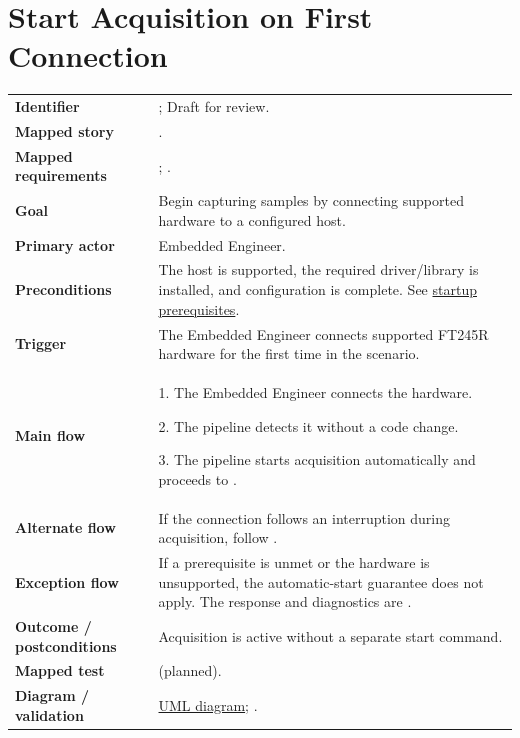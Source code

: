 \section{Start Acquisition on First Connection}
\begin{tabularx}{\linewidth}{L{3.5cm}Y}
\toprule
\textbf{Identifier} & ; Draft for review.\\
\textbf{Mapped story} & .\\
\textbf{Mapped requirements} & ; .\\
\textbf{Goal} & Begin capturing samples by connecting supported hardware to a configured host.\\
\textbf{Primary actor} & Embedded Engineer.\\
\textbf{Preconditions} & The host is supported, the required driver/library is installed, and configuration is complete. See \hyperref[Section:ProjectStartupPrerequisites]{startup prerequisites}.\\
\textbf{Trigger} & The Embedded Engineer connects supported FT245R hardware for the first time in the scenario.\\
\textbf{Main flow} & 1. The Embedded Engineer connects the hardware.\par 2. The pipeline detects it without a code change.\par 3. The pipeline starts acquisition automatically and proceeds to .\\
\textbf{Alternate flow} & If the connection follows an interruption during acquisition, follow .\\
\textbf{Exception flow} & If a prerequisite is unmet or the hardware is unsupported, the automatic-start guarantee does not apply. The response and diagnostics are \OwnedTBD{}.\\
\textbf{Outcome / postconditions} & Acquisition is active without a separate start command.\\
\textbf{Mapped test} &  (planned).\\
\textbf{Diagram / validation} & \hyperref[Figure:UseCaseDiagram]{UML diagram}; .\\
\bottomrule
\end{tabularx}

\clearpage
